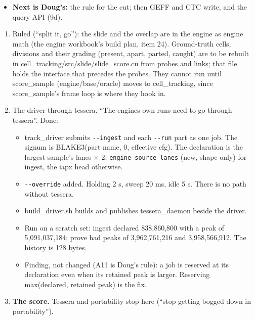 \begin{itemize}
\begin{itemize}
\begin{itemize}
\item A just-divided pair separates only at levels where the parent is gone, or not at all.
\item One global drift misses daughters that move apart.
\item A division is found by a per-chain level (row 1's slide), with a per-body drift or climb in place of the frame's.
\end{itemize}
\item \textbf{Next is Doug's:} the rule for the cut; then GEFF and CTC write, and the query API (9d).
\end{itemize}
\end{itemize}

\begin{enumerate}
\item Ruled (“split it, go”): the slide and the overlap are in the engine as engine math (the engine workbook's build plan, item 24). Ground-truth cells, divisions and their grading (present, apart, parted, caught) are to be rebuilt in cell\_\allowbreak{}tracking/src/slide/slide\_\allowbreak{}score.cu from probes and links; that file holds the interface that precedes the probes. They cannot run until score\_\allowbreak{}sample (engine/base/oracle) moves to cell\_\allowbreak{}tracking, since score\_\allowbreak{}sample's frame loop is where they hook in.
\item The driver through tessera. “The engines own runs need to go through tessera”. Done:

\begin{itemize}
\item track\_\allowbreak{}driver submits \texttt{-\allowbreak{}-\allowbreak{}ingest} and each \texttt{-\allowbreak{}-\allowbreak{}run} part as one job. The signum is BLAKE3(part name, 0, effective cfg). The declaration is the largest sample's lanes × 2: \texttt{engine\_\allowbreak{}source\_\allowbreak{}lanes} (new, shape only) for ingest, the iapx head otherwise.
\item \texttt{-\allowbreak{}-\allowbreak{}override} added. Holding 2 s, sweep 20 ms, idle 5 s. There is no path without tessera.
\item build\_\allowbreak{}driver.sh builds and publishes tessera\_\allowbreak{}daemon beside the driver.
\item Run on a scratch set: ingest declared 838,860,800 with a peak of 5,091,037,184; prove had peaks of 3,962,761,216 and 3,958,566,912. The history is 128 bytes.
\item Finding, not changed (A11 is Doug's rule): a job is reserved at its declaration even when its retained peak is larger. Reserving max(declared, retained peak) is the fix.
\end{itemize}
\item \textbf{The score.} Tessera and portability stop here (“stop getting bogged down in portability”).


\end{enumerate}
